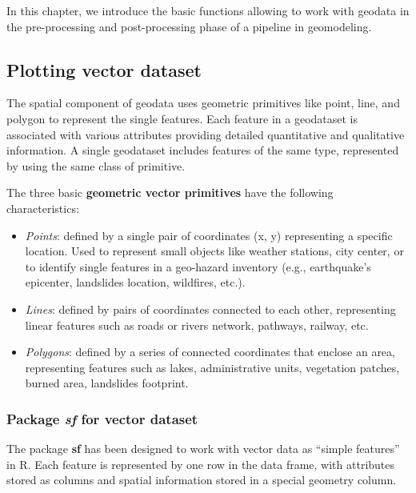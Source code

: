 \documentclass[
]{article}
\providecommand{\tightlist}{%
  \setlength{\itemsep}{0pt}\setlength{\parskip}{0pt}}
\begin{document}
In this chapter, we introduce the basic functions allowing to work with geodata in the pre-processing and post-processing phase of a pipeline in geomodeling.

\subsection{Plotting vector dataset}\label{plotting-vector-dataset}

The spatial component of geodata uses geometric primitives like point, line, and polygon to represent the single features. Each feature in a geodataset is associated with various attributes providing detailed quantitative and qualitative information. A single geodataset includes features of the same type, represented by using the same class of primitive.

The three basic \textbf{geometric vector primitives} have the following characteristics:

\begin{itemize}
\tightlist
\item
  \emph{Points}: defined by a single pair of coordinates (x, y) representing a specific location. Used to represent small objects like weather stations, city center, or to identify single features in a geo-hazard inventory (e.g., earthquake's epicenter, landslides location, wildfires, etc.).
\item
  \emph{Lines}: defined by pairs of coordinates connected to each other, representing linear features such as roads or rivers network, pathways, railway, etc.
\item
  \emph{Polygons}: defined by a series of connected coordinates that enclose an area, representing features such as lakes, administrative units, vegetation patches, burned area, landslides footprint.
\end{itemize}

\subsubsection{\texorpdfstring{Package \textbf{\emph{sf}} for vector dataset}{Package sf for vector dataset}}\label{package-sf-for-vector-dataset}

The package \textbf{sf} \citep{Pebesma_2023, Pebesma_2018} has been designed to work with vector data as ``simple features'' in R. Each feature is represented by one row in the data frame, with attributes stored as columns and spatial information stored in a special geometry column.
\end{document}
